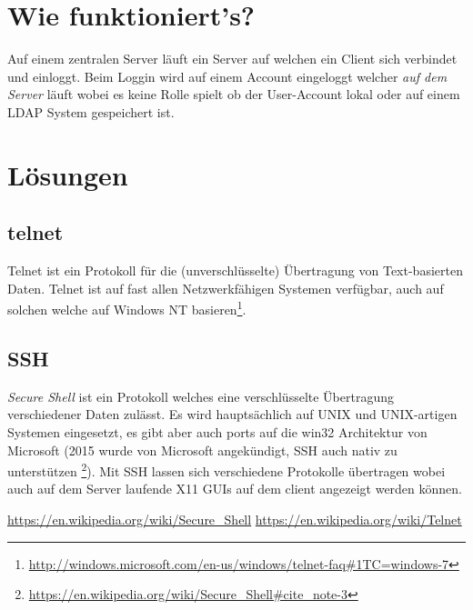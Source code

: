 \documentclass[11pt,twoside,a4paper]{article}
\begin{document}
	\section{Wie funktioniert's?}
	\begin{multicols}{2}
          Auf einem zentralen Server läuft ein Server auf welchen ein Client sich verbindet und einloggt. Beim Loggin wird auf einem Account eingeloggt welcher \textit{auf dem Server} läuft wobei es keine Rolle spielt ob der User-Account lokal oder auf einem LDAP System gespeichert ist. 
	\end{multicols}
        
	\section{Lösungen}
          \subsection{telnet}
          Telnet ist ein Protokoll für die (unverschlüsselte) Übertragung von
          Text-basierten Daten. Telnet ist auf fast allen Netzwerkfähigen
          Systemen verfügbar, auch auf solchen welche auf Windows NT
          basieren\footnote{\url{http://windows.microsoft.com/en-us/windows/telnet-faq\#1TC=windows-7}}.

          \subsection{SSH} 
          \textit{Secure Shell} ist ein Protokoll welches eine verschlüsselte
          Übertragung verschiedener Daten zulässt. Es wird hauptsächlich auf UNIX und UNIX-artigen Systemen eingesetzt, es gibt aber auch ports auf die win32 Architektur von Microsoft (2015 wurde von Microsoft angekündigt, SSH auch nativ zu unterstützen \footnote{\url{https://en.wikipedia.org/wiki/Secure_Shell\#cite_note-3}}). Mit SSH lassen sich verschiedene Protokolle übertragen wobei auch auf dem Server laufende X11 GUIs auf dem client angezeigt werden können.
          

	\begin{thebibliography}{9}
        \url{https://en.wikipedia.org/wiki/Secure_Shell}
        \url{https://en.wikipedia.org/wiki/Telnet}
        \end{thebibliography}

	
\end{document}
